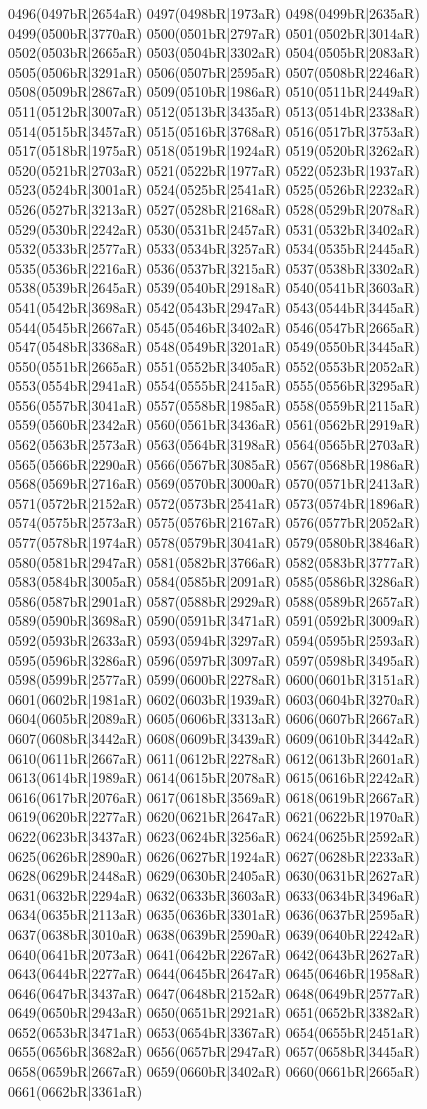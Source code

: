 0496(0497bR|2654aR) 0497(0498bR|1973aR) 0498(0499bR|2635aR) 0499(0500bR|3770aR) 0500(0501bR|2797aR) 0501(0502bR|3014aR) 0502(0503bR|2665aR) 0503(0504bR|3302aR) 0504(0505bR|2083aR) 0505(0506bR|3291aR) 0506(0507bR|2595aR) 0507(0508bR|2246aR) 0508(0509bR|2867aR) 0509(0510bR|1986aR) 0510(0511bR|2449aR) 0511(0512bR|3007aR) 0512(0513bR|3435aR) 0513(0514bR|2338aR) 0514(0515bR|3457aR) 0515(0516bR|3768aR) 0516(0517bR|3753aR) 0517(0518bR|1975aR) 0518(0519bR|1924aR) 0519(0520bR|3262aR) 0520(0521bR|2703aR) 0521(0522bR|1977aR) 0522(0523bR|1937aR) 0523(0524bR|3001aR) 0524(0525bR|2541aR) 0525(0526bR|2232aR) 0526(0527bR|3213aR) 0527(0528bR|2168aR) 0528(0529bR|2078aR) 0529(0530bR|2242aR) 0530(0531bR|2457aR) 0531(0532bR|3402aR) 0532(0533bR|2577aR) 0533(0534bR|3257aR) 0534(0535bR|2445aR) 0535(0536bR|2216aR) 0536(0537bR|3215aR) 0537(0538bR|3302aR) 0538(0539bR|2645aR) 0539(0540bR|2918aR) 0540(0541bR|3603aR) 0541(0542bR|3698aR) 0542(0543bR|2947aR) 0543(0544bR|3445aR) 0544(0545bR|2667aR) 0545(0546bR|3402aR) 0546(0547bR|2665aR) 0547(0548bR|3368aR) 0548(0549bR|3201aR) 0549(0550bR|3445aR) 0550(0551bR|2665aR) 0551(0552bR|3405aR) 0552(0553bR|2052aR) 0553(0554bR|2941aR) 0554(0555bR|2415aR) 0555(0556bR|3295aR) 0556(0557bR|3041aR) 0557(0558bR|1985aR) 0558(0559bR|2115aR) 0559(0560bR|2342aR) 0560(0561bR|3436aR) 0561(0562bR|2919aR) 0562(0563bR|2573aR) 0563(0564bR|3198aR) 0564(0565bR|2703aR) 0565(0566bR|2290aR) 0566(0567bR|3085aR) 0567(0568bR|1986aR) 0568(0569bR|2716aR) 0569(0570bR|3000aR) 0570(0571bR|2413aR) 0571(0572bR|2152aR) 0572(0573bR|2541aR) 0573(0574bR|1896aR) 0574(0575bR|2573aR) 0575(0576bR|2167aR) 0576(0577bR|2052aR) 0577(0578bR|1974aR) 0578(0579bR|3041aR) 0579(0580bR|3846aR) 0580(0581bR|2947aR) 0581(0582bR|3766aR) 0582(0583bR|3777aR) 0583(0584bR|3005aR) 0584(0585bR|2091aR) 0585(0586bR|3286aR) 0586(0587bR|2901aR) 0587(0588bR|2929aR) 0588(0589bR|2657aR) 0589(0590bR|3698aR) 0590(0591bR|3471aR) 0591(0592bR|3009aR) 0592(0593bR|2633aR) 0593(0594bR|3297aR) 0594(0595bR|2593aR) 0595(0596bR|3286aR) 0596(0597bR|3097aR) 0597(0598bR|3495aR) 0598(0599bR|2577aR) 0599(0600bR|2278aR) 0600(0601bR|3151aR) 0601(0602bR|1981aR) 0602(0603bR|1939aR) 0603(0604bR|3270aR) 0604(0605bR|2089aR) 0605(0606bR|3313aR) 0606(0607bR|2667aR) 0607(0608bR|3442aR) 0608(0609bR|3439aR) 0609(0610bR|3442aR) 0610(0611bR|2667aR) 0611(0612bR|2278aR) 0612(0613bR|2601aR) 0613(0614bR|1989aR) 0614(0615bR|2078aR) 0615(0616bR|2242aR) 0616(0617bR|2076aR) 0617(0618bR|3569aR) 0618(0619bR|2667aR) 0619(0620bR|2277aR) 0620(0621bR|2647aR) 0621(0622bR|1970aR) 0622(0623bR|3437aR) 0623(0624bR|3256aR) 0624(0625bR|2592aR) 0625(0626bR|2890aR) 0626(0627bR|1924aR) 0627(0628bR|2233aR) 0628(0629bR|2448aR) 0629(0630bR|2405aR) 0630(0631bR|2627aR) 0631(0632bR|2294aR) 0632(0633bR|3603aR) 0633(0634bR|3496aR) 0634(0635bR|2113aR) 0635(0636bR|3301aR) 0636(0637bR|2595aR) 0637(0638bR|3010aR) 0638(0639bR|2590aR) 0639(0640bR|2242aR) 0640(0641bR|2073aR) 0641(0642bR|2267aR) 0642(0643bR|2627aR) 0643(0644bR|2277aR) 0644(0645bR|2647aR) 0645(0646bR|1958aR) 0646(0647bR|3437aR) 0647(0648bR|2152aR) 0648(0649bR|2577aR) 0649(0650bR|2943aR) 0650(0651bR|2921aR) 0651(0652bR|3382aR) 0652(0653bR|3471aR) 0653(0654bR|3367aR) 0654(0655bR|2451aR) 0655(0656bR|3682aR) 0656(0657bR|2947aR) 0657(0658bR|3445aR) 0658(0659bR|2667aR) 0659(0660bR|3402aR) 0660(0661bR|2665aR) 0661(0662bR|3361aR) 